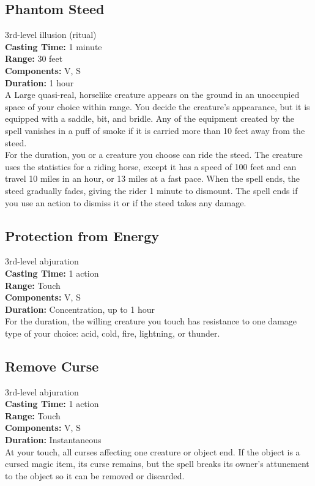 \documentclass[11pt, A4paper, english]{article}
\begin{document}
		\subsection{Phantom Steed}
3rd-level illusion (ritual) \\
\textbf{Casting Time:} 1 minute \\
\textbf{Range:} 30 feet \\
\textbf{Components:} V, S \\
\textbf{Duration:} 1 hour \\
A Large quasi-real, horselike creature appears on the ground in an unoccupied space of your choice within range. You decide the creature's appearance, but it is equipped with a saddle, bit, and bridle. Any of the equipment created by the spell vanishes in a puff of smoke if it is carried more than 10 feet away from the steed. \\
For the duration, you or a creature you choose can ride the steed. The creature uses the statistics for a riding horse, except it has a speed of 100 feet and can travel 10 miles in an hour, or 13 miles at a fast pace. When the spell ends, the steed gradually fades, giving the rider 1 minute to dismount. The spell ends if you use an action to dismiss it or if the steed takes any damage.

		\subsection{Protection from Energy}
3rd-level abjuration \\
\textbf{Casting Time:} 1 action \\
\textbf{Range:} Touch \\
\textbf{Components:} V, S \\
\textbf{Duration:} Concentration, up to 1 hour \\
For the duration, the willing creature you touch has resistance to one damage type of your choice: acid, cold, fire, lightning, or thunder.

		\subsection{Remove Curse}
3rd-level abjuration \\
\textbf{Casting Time:} 1 action \\
\textbf{Range:} Touch \\
\textbf{Components:} V, S \\
\textbf{Duration:} Instantaneous \\
At your touch, all curses affecting one creature or object end. If the object is a cursed magic item, its curse remains, but the spell breaks its owner's attunement to the object so it can be removed or discarded.
\end{document}
